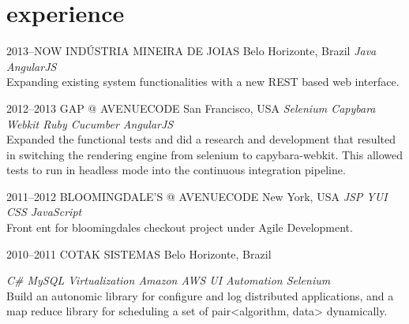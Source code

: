 \documentclass[]{friggeri-cv}
\begin{document}
\section{experience}

\begin{entrylist}


\entry
{2013--NOW}
{INDÚSTRIA MINEIRA DE JOIAS}
{Belo Horizonte, Brazil}
{\emph{\bullet Java \bullet AngularJS } \\  Expanding existing system functionalities with a new REST based web interface.}


\entry
{2012--2013}
{GAP @ AVENUECODE}
{San Francisco, USA}
{\emph{\bullet Selenium \bullet Capybara \bullet Webkit \bullet Ruby \bullet Cucumber \bullet AngularJS } \\ Expanded the functional tests and did a research and development that resulted in switching the rendering engine from selenium to capybara-webkit. This allowed tests to run in  headless mode into the continuous integration pipeline.
}


\entry
{2011--2012}
{BLOOMINGDALE'S @ AVENUECODE}
{New York, USA}
{\emph{\bullet JSP \bullet YUI \bullet CSS \bullet JavaScript } \\ Front ent for bloomingdales checkout project under Agile Development. 
}

\entry
{2010--2011}
{COTAK SISTEMAS}
{Belo Horizonte, Brazil}
{\emph{\bullet C\# \bullet MySQL \bullet Virtualization \bullet Amazon AWS \bullet UI Automation \bullet Selenium } \\ Build an autonomic library for configure and log distributed applications, and a map reduce library for scheduling a set of pair<algorithm, data> dynamically. 

% 
}


\end{entrylist}
\end{document}

